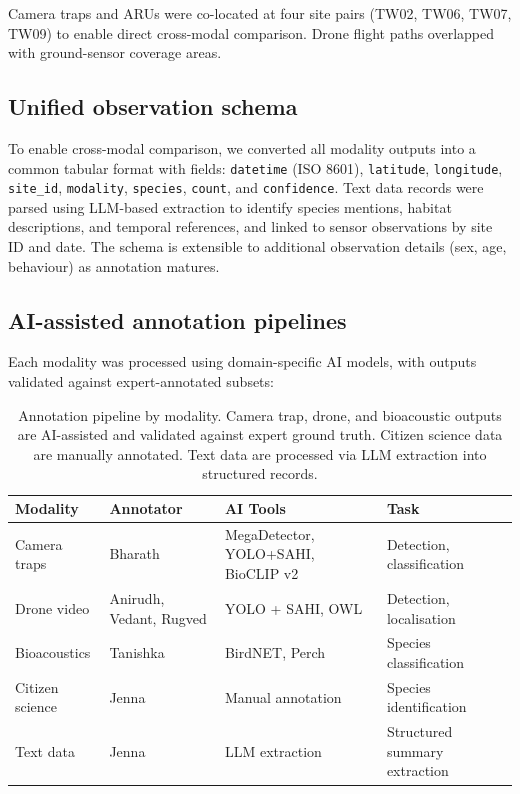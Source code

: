 \documentclass[12pt]{article}
\begin{document}
Camera traps and ARUs were co-located at four site pairs (TW02, TW06, TW07, TW09) to enable direct cross-modal comparison. Drone flight paths overlapped with ground-sensor coverage areas. %

\subsection{Unified observation schema}

To enable cross-modal comparison, we converted all modality outputs into a common tabular format with fields: \texttt{datetime} (ISO 8601), \texttt{latitude}, \texttt{longitude}, \texttt{site\_id}, \texttt{modality}, \texttt{species}, \texttt{count}, and \texttt{confidence}. Text data records were parsed using LLM-based extraction to identify species mentions, habitat descriptions, and temporal references, and linked to sensor observations by site ID and date. The schema is extensible to additional observation details (sex, age, behaviour) as annotation matures.

\subsection{AI-assisted annotation pipelines}

Each modality was processed using domain-specific AI models, with outputs validated against expert-annotated subsets:

\begin{table}[h]
\centering
\begin{tabular}{llll}
\toprule
\textbf{Modality} & \textbf{Annotator} & \textbf{AI Tools} & \textbf{Task} \\
\midrule
Camera traps & Bharath & MegaDetector, YOLO+SAHI, BioCLIP v2 & Detection, classification \\
Drone video & Anirudh, Vedant, Rugved & YOLO + SAHI, OWL & Detection, localisation \\
Bioacoustics & Tanishka & BirdNET, Perch & Species classification \\
Citizen science & Jenna & Manual annotation & Species identification \\
Text data & Jenna & LLM extraction & Structured summary extraction \\
\bottomrule
\end{tabular}
\caption{Annotation pipeline by modality. Camera trap, drone, and bioacoustic outputs are AI-assisted and validated against expert ground truth. Citizen science data are manually annotated. Text data are processed via LLM extraction into structured records.}
\label{table:annotation_tools}
\end{table}
\end{document}
